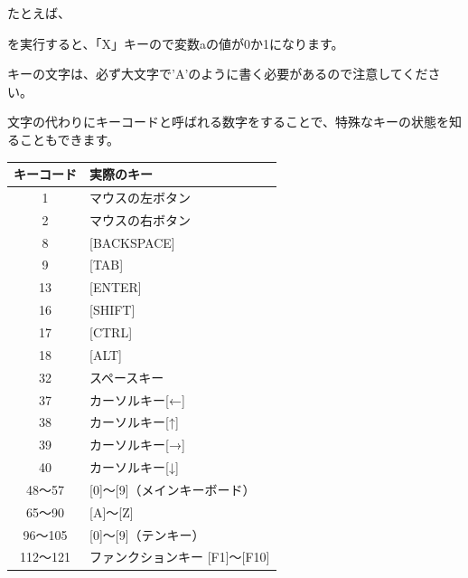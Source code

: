 たとえば、


\begin{description}
    \item {}
\end{description}


を実行すると、「X」キーので変数aの値が0か1になります。


\begin{description}
    \item {}
    \item {}
\end{description}

キーの文字は、必ず大文字で’A’のように書く必要があるので注意してください。

文字の代わりにキーコードと呼ばれる数字をすることで、特殊なキーの状態を知ることもできます。

\begin{center}
    \begin{tabular}{c|l} \hline
        キーコード & 実際のキー \\ \hline
        1 & マウスの左ボタン \\
        2 & マウスの右ボタン \\
        8 & [BACKSPACE] \\
        9 & [TAB] \\
        13 & [ENTER] \\
        16 & [SHIFT] \\
        17 & [CTRL] \\
        18 & [ALT] \\
        32 & スペースキー \\
        37 & カーソルキー[←] \\
        38 & カーソルキー[↑] \\
        39 & カーソルキー[→] \\
        40 & カーソルキー[↓] \\
        48〜57 & [0]〜[9]（メインキーボード） \\
        65〜90 & [A]〜[Z] \\
        96〜105 & [0]〜[9]（テンキー） \\
        112〜121 & ファンクションキー [F1]〜[F10] \\ \hline
    \end{tabular}
\end{center}

